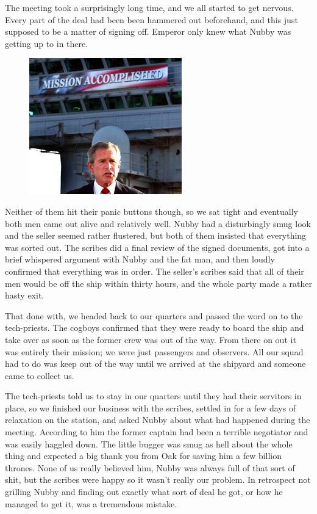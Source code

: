The meeting took a surprisingly long time, and we all started to get nervous. 
Every part of the deal had been been hammered out beforehand, and this just supposed to be a matter of signing off. 
Emperor only knew what Nubby was getting up to in there. 


\begin{figure}
	\begin{center}
		\includegraphics[width=\figwidth]{pics/7/8.png}
	\end{center}
\end{figure}
Neither of them hit their panic buttons though, so we sat tight and eventually both men came out alive and relatively well. 
Nubby had a disturbingly smug look and the seller seemed rather flustered, but both of them insisted that everything was sorted out. 
The scribes did a final review of the signed documents, got into a brief whispered argument with Nubby and the fat man, and then loudly confirmed that everything was in order. 
The seller’s scribes said that all of their men would be off the ship within thirty hours, and the whole party made a rather hasty exit.

That done with, we headed back to our quarters and passed the word on to the tech-priests. 
The cogboys confirmed that they were ready to board the ship and take over as soon as the former crew was out of the way. 
From there on out it was entirely their mission; 
we were just passengers and observers. 
All our squad had to do was keep out of the way until we arrived at the shipyard and someone came to collect us.

The tech-priests told us to stay in our quarters until they had their servitors in place, so we finished our business with the scribes, settled in for a few days of relaxation on the station, and asked Nubby about what had happened during the meeting. 
According to him the former captain had been a terrible negotiator and was easily haggled down. 
The little bugger was smug as hell about the whole thing and expected a big thank you from Oak for saving him a few billion thrones. 
None of us really believed him, Nubby was always full of that sort of shit, but the scribes were happy so it wasn’t really our problem. 
In retrospect not grilling Nubby and finding out exactly what sort of deal he got, or how he managed to get it, was a tremendous mistake.

